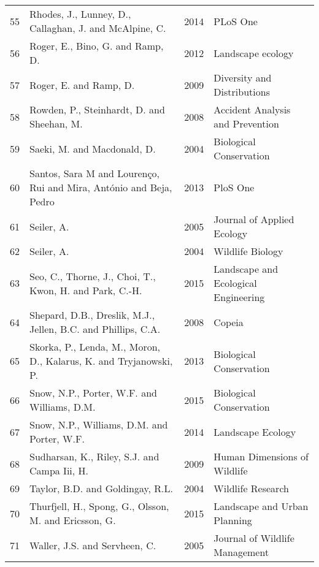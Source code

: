 \begin{longtable}[c]{p{.75cm}p{6cm}p{1.25cm}p{5.5cm}}
   55 & Rhodes, J., Lunney, D., Callaghan, J. and McAlpine, C. & 2014 & PLoS One \\ 
   56 & Roger, E., Bino, G. and Ramp, D. & 2012 & Landscape ecology \\ 
   57 & Roger, E. and Ramp, D. & 2009 & Diversity and Distributions \\ 
   58 & Rowden, P., Steinhardt, D. and Sheehan, M. & 2008 & Accident Analysis and Prevention  \\ 
   59 & Saeki, M. and Macdonald, D. & 2004 & Biological Conservation  \\ 
   60 & Santos, Sara M and Louren{\c{c}}o, Rui and Mira, Ant{\'o}nio and Beja, Pedro & 2013 & PloS One \\ 
   61 & Seiler, A. & 2005 & Journal of Applied Ecology \\ 
   62 & Seiler, A. & 2004 & Wildlife Biology \\ 
   63 & Seo, C., Thorne, J., Choi, T., Kwon, H. and Park, C.-H. & 2015 & Landscape and Ecological Engineering \\ 
   64 & Shepard, D.B., Dreslik, M.J., Jellen, B.C. and Phillips, C.A. & 2008 & Copeia \\ 
   65 & Skorka, P., Lenda, M., Moron, D., Kalarus, K. and Tryjanowski, P. & 2013 & Biological Conservation  \\ 
   66 & Snow, N.P., Porter, W.F. and Williams, D.M. & 2015 & Biological Conservation  \\ 
   67 & Snow, N.P., Williams, D.M. and Porter, W.F. & 2014 & Landscape Ecology \\ 
   68 & Sudharsan, K., Riley, S.J. and Campa Iii, H. & 2009 & Human Dimensions of Wildlife \\ 
   69 & Taylor, B.D. and Goldingay, R.L. & 2004 & Wildlife Research \\ 
   70 & Thurfjell, H., Spong, G., Olsson, M. and Ericsson, G. & 2015 & Landscape and Urban Planning  \\ 
   71 & Waller, J.S. and Servheen, C. & 2005 & Journal of Wildlife Management \\ 
   \hline
\end{longtable}


